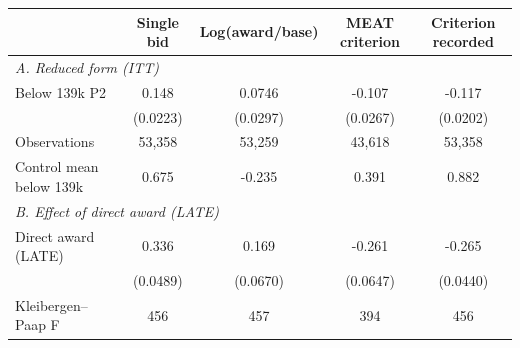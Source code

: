 \begin{tabular}{l*{4}{c}}
\toprule
            &\multicolumn{1}{c}{Single bid}&\multicolumn{1}{c}{Log(award/base)}&\multicolumn{1}{c}{MEAT criterion}&\multicolumn{1}{c}{Criterion recorded}\\
\midrule
\multicolumn{5}{l}{\textit{A. Reduced form (ITT)}}\\
Below 139k \texttimes{} P2&       0.148\sym{***}&      0.0746\sym{**} &      -0.107\sym{***}&      -0.117\sym{***}\\
            &    (0.0223)         &    (0.0297)         &    (0.0267)         &    (0.0202)         \\
\addlinespace
Observations&      53,358         &      53,259         &      43,618         &      53,358         \\
Control mean below 139k&       0.675         &      -0.235         &       0.391         &       0.882         \\
\midrule
\multicolumn{5}{l}{\textit{B. Effect of direct award (LATE)}}\\
\addlinespace[1pt]
Direct award (LATE)&       0.336\sym{***}&       0.169\sym{**} &      -0.261\sym{***}&      -0.265\sym{***}\\
            &    (0.0489)         &    (0.0670)         &    (0.0647)         &    (0.0440)         \\
\addlinespace
Kleibergen--Paap F&         456         &         457         &         394         &         456         \\
\bottomrule
\end{tabular}
